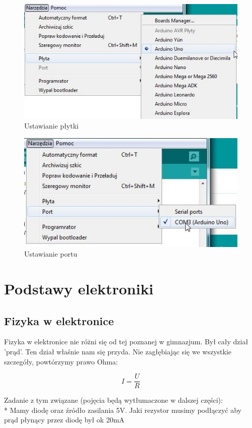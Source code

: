 \documentclass[a4paper,12pt, twoside]{article}
\let\oldsection\section		%
\renewcommand\section{\clearpage\oldsection}%
\begin{document}
\cite{Introduction, Reference}


\begin{figure} %
  \includegraphics[scale=0.7]{arduino-ustawPlytke.jpg}
  \caption{Ustawianie płytki}
  \label{fig:test}
	\end{figure}
	\begin{figure}
  \includegraphics[scale=0.7]{arduino-ustawPort.jpg}
  \caption{Ustawianie portu}
  \label{fig:test}
\end{figure}


\section{Podstawy elektroniki}
 \subsection{Fizyka w elektronice}
	Fizyka w elektronice nie różni się od tej poznanej w gimnazjum. Był cały dział 'prąd'. Ten dział właśnie nam się przyda. Nie zagłębiając się we wszystkie szczegóły, powtórzymy prawo Ohma:
	\begin{center}
	\[
	I=\frac{U}{R}
	\]	
	\end{center}
Zadanie z tym związane (pojęcia będą wytłumaczone w dalszej części): \\* Mamy diodę oraz źródło zasilania 5V. Jaki rezystor musimy podłączyć aby prąd płynący przez diodę był ok 20mA %
\end{document}

